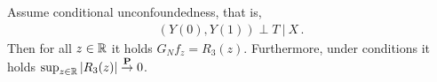 %
%
\begin{lemma}
  \label{aa:mean:l:r3}
  Assume conditional unconfoundedness, that is,
  \begin{gather}
  (Y(0),Y(1))\perp T \ |\ X
  \,.
  \end{gather}
  Then for all
  $z\in\mathbb{R}$
  it holds
  $
  G_Nf_z=R_3(z)
  $.
  Furthermore, under conditions it holds
  $\sup_{z\in\mathbb{R}}\left| R_3(z) \right|\overset{\mathbf{P}}{\to}0$.
\end{lemma}
